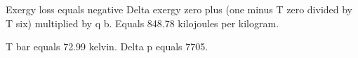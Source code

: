 Exergy loss equals negative Delta exergy zero plus (one minus T zero divided by T six) multiplied by q b.  
Equals 848.78 kilojoules per kilogram.  

T bar equals 72.99 kelvin.  
Delta p equals 7705.